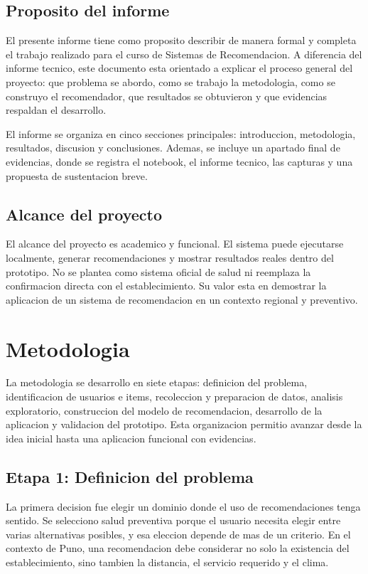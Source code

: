 \documentclass[12pt,a4paper]{article}
\begin{document}
\subsection{Proposito del informe}
El presente informe tiene como proposito describir de manera formal y completa el trabajo realizado para el curso de Sistemas de Recomendacion. A diferencia del informe tecnico, este documento esta orientado a explicar el proceso general del proyecto: que problema se abordo, como se trabajo la metodologia, como se construyo el recomendador, que resultados se obtuvieron y que evidencias respaldan el desarrollo.

El informe se organiza en cinco secciones principales: introduccion, metodologia, resultados, discusion y conclusiones. Ademas, se incluye un apartado final de evidencias, donde se registra el notebook, el informe tecnico, las capturas y una propuesta de sustentacion breve.

\subsection{Alcance del proyecto}
El alcance del proyecto es academico y funcional. El sistema puede ejecutarse localmente, generar recomendaciones y mostrar resultados reales dentro del prototipo. No se plantea como sistema oficial de salud ni reemplaza la confirmacion directa con el establecimiento. Su valor esta en demostrar la aplicacion de un sistema de recomendacion en un contexto regional y preventivo.

\section{Metodologia}
La metodologia se desarrollo en siete etapas: definicion del problema, identificacion de usuarios e items, recoleccion y preparacion de datos, analisis exploratorio, construccion del modelo de recomendacion, desarrollo de la aplicacion y validacion del prototipo. Esta organizacion permitio avanzar desde la idea inicial hasta una aplicacion funcional con evidencias.

\subsection{Etapa 1: Definicion del problema}
La primera decision fue elegir un dominio donde el uso de recomendaciones tenga sentido. Se selecciono salud preventiva porque el usuario necesita elegir entre varias alternativas posibles, y esa eleccion depende de mas de un criterio. En el contexto de Puno, una recomendacion debe considerar no solo la existencia del establecimiento, sino tambien la distancia, el servicio requerido y el clima.
\end{document}
